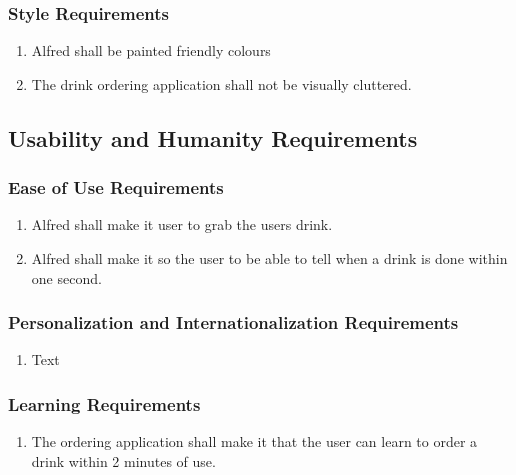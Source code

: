 \documentclass [11pt]{article}
\begin{document}
\subsubsection{Style Requirements}
	\begin{enumerate}[label=\textbf{(\roman*)}]
		\item  Alfred shall be painted friendly colours
		\item The drink ordering application shall not be visually cluttered.
	\end{enumerate}

\subsection{Usability and Humanity Requirements} 

\subsubsection{Ease of Use Requirements}
	\begin{enumerate}[label=\textbf{(\roman*)}]
		\item Alfred shall make it user to grab the users drink.
		\item Alfred shall make it so the user to be able to tell when a drink is done within one second.
	\end{enumerate}

\subsubsection{Personalization and Internationalization Requirements}
	\begin{enumerate}[label=\textbf{(\roman*)}]
		\item Text
	\end{enumerate}

\subsubsection{Learning Requirements }
	\begin{enumerate}[label=\textbf{(\roman*)}]
		\item The ordering application shall make it that the user can learn to order a drink within 2 minutes of use.
	\end{enumerate}
\end{document}

